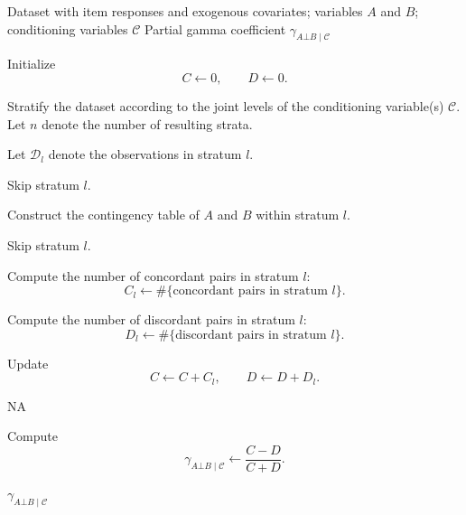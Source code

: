 \begin{breakablealgorithm}
\caption{Partial $\gamma$ coefficient for testing $A \bot B \mid \mathcal{C}$}
\label{alg:part_gam}

\begin{algorithmic}
\Require Dataset with item responses and exogenous covariates; variables $A$ and $B$; conditioning variables $\mathcal{C}$
\Ensure Partial gamma coefficient $\gamma_{A \bot B \mid \mathcal{C}}$

\State Initialize
\[
C \gets 0,
\qquad
D \gets 0.
\]

\State Stratify the dataset according to the joint levels of the conditioning variable(s) $\mathcal{C}$.
\State Let $n$ denote the number of resulting strata.


    \State Let $\mathcal{D}_l$ denote the observations in stratum $l$.

        \State Skip stratum $l$.
    \EndIf

    \State Construct the contingency table of $A$ and $B$ within stratum $l$.

        \State Skip stratum $l$.
    \EndIf

    \State Compute the number of concordant pairs in stratum $l$:
    \[
    C_l \gets \#\{\text{concordant pairs in stratum } l\}.
    \]

    \State Compute the number of discordant pairs in stratum $l$:
    \[
    D_l \gets \#\{\text{discordant pairs in stratum } l\}.
    \]

    \State Update
    \[
    C \gets C + C_l,
    \qquad
    D \gets D + D_l.
    \]

\EndFor

    \State \Return $\mathrm{NA}$
\EndIf

\State Compute
%
\[
\gamma_{A \bot B \mid \mathcal{C}}
\gets
\frac{C-D}{C+D}.
\]

\State \Return $\gamma_{A \bot B \mid \mathcal{C}}$

\end{algorithmic}
\end{breakablealgorithm}

